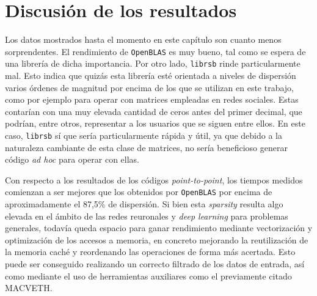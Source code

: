 \section{Discusión de los resultados}
Los datos mostrados hasta el momento en este capítulo son cuanto menos sorprendentes. El rendimiento de \texttt{OpenBLAS} es muy bueno, tal como se espera de una librería de dicha importancia. Por otro lado, \texttt{librsb} rinde particularmente mal. Esto indica que quizás esta librería esté orientada a niveles de dispersión varios órdenes de magnitud por encima de los que se utilizan en este trabajo, como por ejemplo para operar con matrices empleadas en redes sociales. Estas contarían con una muy elevada cantidad de ceros antes del primer decimal, que podrían, entre otros, representar a los usuarios que se siguen entre ellos. En este caso, \texttt{librsb} sí que sería particularmente rápida y útil, ya que debido a la naturaleza cambiante de esta clase de matrices, no sería beneficioso generar código \textit{ad hoc} para operar con ellas.

Con respecto a los resultados de los códigos \textit{point-to-point}, los tiempos medidos comienzan a ser mejores que los obtenidos por \texttt{OpenBLAS} por encima de aproximadamente el 87,5\% de dispersión. Si bien esta \textit{sparsity} resulta algo elevada en el ámbito de las redes reuronales y \textit{deep learning} para problemas generales, todavía queda espacio para ganar rendimiento mediante vectorización y optimización de los accesos a memoria, en concreto mejorando la reutilización de la memoria caché y reordenando las operaciones de forma más acertada. Esto puede ser conseguido realizando un correcto filtrado de los datos de entrada, así como mediante el uso de herramientas auxiliares como el previamente citado MACVETH.
